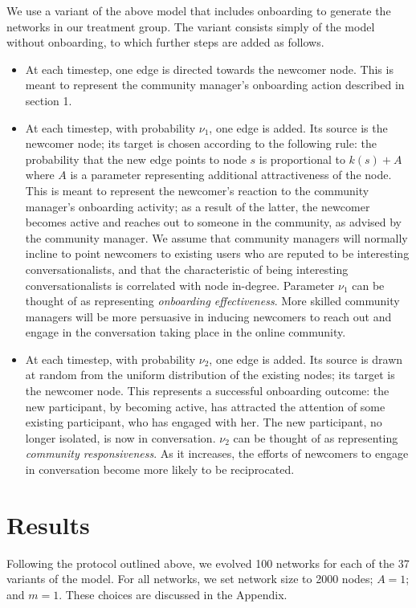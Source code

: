 \documentclass{bmcart}
\begin{document}
We use a variant of the above model that includes onboarding to generate the networks in our treatment group. The variant consists simply of the model without onboarding, to which further steps are added as follows.
\begin{itemize}
\item At each timestep, one edge is directed towards the newcomer node. This is meant to represent the community manager's onboarding action described in section 1. 
\item At each timestep, with probability $\nu_1$, one edge is added. Its source is the newcomer node; its target is chosen according to the following rule: the probability that the new edge points to node $s$ is proportional to $k(s) + A$ where $A$ is a parameter representing additional attractiveness of the node. This is meant to represent the newcomer's reaction to the community manager's onboarding activity; as a result of the latter, the newcomer becomes active and reaches out to someone in the community, as advised by the community manager. We assume that community managers will normally incline to point newcomers to existing users who are reputed to be interesting conversationalists, and that the characteristic of being interesting conversationalists is correlated with node in-degree. Parameter $\nu_1$ can be thought of as representing \emph{onboarding effectiveness}. More skilled community managers will be more persuasive in inducing newcomers to reach out and engage in the conversation taking place in the online community.
\item At each timestep, with probability $\nu_2$, one edge is added. Its source is drawn at random from the uniform distribution of the existing nodes; its target is the newcomer node. This represents a successful onboarding outcome: the new participant, by becoming active, has attracted the attention of some existing participant, who has engaged with her. The new participant, no longer isolated, is now in conversation. $\nu_2$ can be thought of as representing \emph{community responsiveness}. As it increases, the efforts of newcomers to engage in conversation become more likely to be reciprocated.
\end{itemize}



\section{Results}\label{sec:results}
Following the protocol outlined above, we evolved 100 networks for each of the 37 variants of the model. For all networks, we set network size to 2000 nodes; $A = 1$; and $m = 1$. These choices are discussed in the Appendix.
\end{document}
